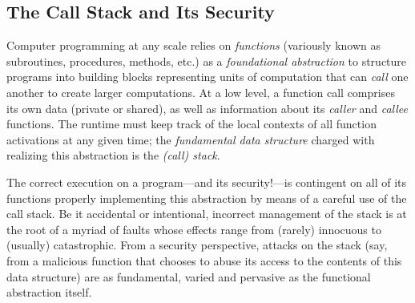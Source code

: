 \subsection{The Call Stack and Its Security}


Computer programming at any scale relies on \emph{functions} (variously known as
subroutines, procedures, methods, etc.) as a \emph{foundational abstraction} to
structure programs into building blocks representing units of computation that
can \emph{call} one another to create larger computations.
%
At a low level, a function call comprises its own data (private or shared), as
well as information about its \emph{caller} and \emph{callee} functions. The
runtime must keep track of the local contexts of all function activations
at any given time; the \emph{fundamental data structure} charged with realizing
this abstraction is the \emph{(call) stack}.
%


The correct execution on a program---and its security!---is contingent on all of
its functions properly implementing this abstraction by means of a careful use
of the call stack. Be it accidental or intentional, incorrect management of the
stack is at the root of a myriad of faults whose effects range from (rarely)
innocuous to (usually) catastrophic.
%
From a security perspective, attacks on the stack (say, from a malicious
function that chooses to abuse its access to the contents of this data
structure) are as fundamental, varied and pervasive as the functional
abstraction itself.
%


